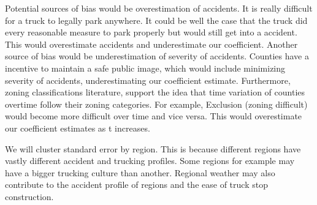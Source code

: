 \documentclass[
  8pt,
  12pt]{article}
\begin{document}
Potential sources of bias would be overestimation of accidents. It is
really difficult for a truck to legally park anywhere. It could be well
the case that the truck did every reasonable measure to park properly
but would still get into a accident. This would overestimate accidents
and underestimate our coefficient. Another source of bias would be
underestimation of severity of accidents. Counties have a incentive to
maintain a safe public image, which would include minimizing severity of
accidents, underestimating our coefficient estimate. Furthermore, zoning
classifications literature, support the idea that time variation of
counties overtime follow their zoning categories. For example, Exclusion
(zoning difficult) would become more difficult over time and vice
versa\citep{mclaughlinLandUseRegulation2012}. This would overestimate
our coefficient estimates as t increases.

We will cluster standard error by region. This is because different
regions have vastly different accident and trucking profiles. Some
regions for example may have a bigger trucking culture than another.
Regional weather may also contribute to the accident profile of regions
and the ease of truck stop construction.


  
\end{document}
